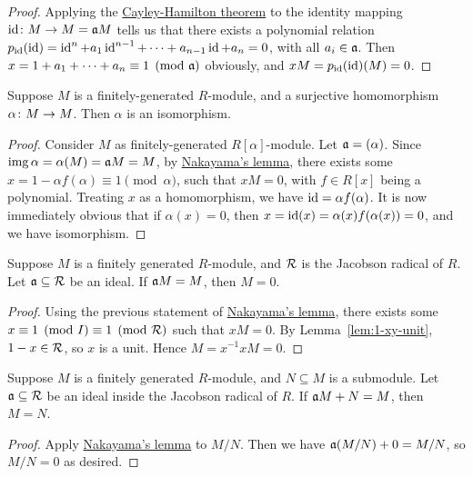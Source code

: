 \begin{proof}
    Applying the \hyperref[lem:cayley-hamilton]{Cayley-Hamilton theorem}
    to the identity mapping \(\operatorname{id}\colon M\to M = \mathfrak{a}M\)
    tells us that there exists a polynomial relation
    \(p_{\operatorname{id}}(\operatorname{id}) = \operatorname{id}^n + a_1\operatorname{id}^{n-1} + \cdots + a_{n-1}\operatorname{id} + a_n = 0\),
    with all \(a_i \in \mathfrak{a}\).
    Then \(x = 1 + a_1 + \cdots + a_n \equiv 1 \pmod{\mathfrak{a}}\) obviously,
    and \(xM = p_{\operatorname{id}}(\operatorname{id})(M) = 0\).
\end{proof}
\begin{corollary}
    Suppose \(M\) is a finitely-generated \(R\)-module,
    and a surjective homomorphism \(\alpha\colon M\to M\).
    Then \(\alpha\) is an isomorphism.
\end{corollary}
\begin{proof}
    Consider \(M\) as finitely-generated \(R[\alpha]\)-module.
    Let \(\mathfrak{a} = (\alpha)\).
    Since \(\operatorname{img}\alpha = \alpha(M) = \mathfrak{a}M = M\),
    by \hyperref[cor:nakayama]{Nakayama's lemma},
    there exists some \(x = 1 - \alpha f(\alpha) \equiv 1 \pmod{\alpha}\),
    such that \(xM = 0\), with \(f \in R[x]\) being a polynomial.
    Treating \(x\) as a homomorphism,
    we have \(\operatorname{id} = \alpha f(\alpha)\).
    It is now immediately obvious that if \(\alpha(x) = 0\),
    then \(x = \operatorname{id}(x) = \alpha(x) f(\alpha(x)) = 0\),
    and we have isomorphism.
\end{proof}

\begin{theorem}\label{thm:nakayama}
    Suppose \(M\) is a finitely generated \(R\)-module,
    and \(\mathcal{R}\) is the Jacobson radical of \(R\).
    Let \(\mathfrak{a} \subseteq \mathcal{R}\) be an ideal.
    If \(\mathfrak{a}M = M\), then \(M = 0\).
\end{theorem}
\begin{proof}
    Using the previous statement of \hyperref[cor:nakayama]{Nakayama's lemma},
    there exists some \(x \equiv 1 \pmod{I} \equiv 1 \pmod{\mathcal{R}}\)
    such that \(xM = 0\).
    By Lemma~\ref{lem:1-xy-unit}, \(1-x \in \mathcal{R}\), so \(x\) is a unit.
    Hence \(M = x^{-1}xM = 0\).
\end{proof}
\begin{corollary}\label{cor:nakayama-quotient}
    Suppose \(M\) is a finitely generated \(R\)-module,
    and \(N \subseteq M\) is a submodule.
    Let \(\mathfrak{a} \subseteq \mathcal{R}\) be an ideal inside the Jacobson radical of \(R\).
    If \(\mathfrak{a}M + N = M\), then \(M = N\).
\end{corollary}
\begin{proof}
    Apply \hyperref[thm:nakayama]{Nakayama's lemma} to \(M/N\).
    Then we have \(\mathfrak{a}(M/N) + 0 = M/N\),
    so \(M/N = 0\) as desired.
\end{proof}

